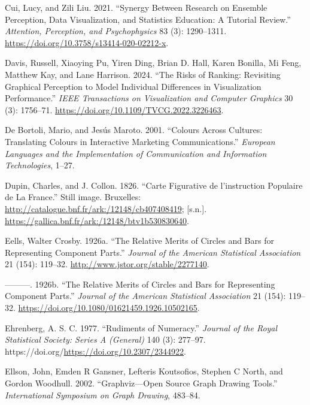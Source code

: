 \documentclass[
  letterpaper,
  DIV=11,
  numbers=noendperiod]{scrreprt}
\newlength{\cslhangindent}
\newenvironment{CSLReferences}[2] %
 {\begin{list}{}{%
  \setlength{\itemindent}{0pt}
  \setlength{\leftmargin}{0pt}
  \setlength{\parsep}{0pt}
  \ifodd #1
   \setlength{\leftmargin}{\cslhangindent}
   \setlength{\itemindent}{-1\cslhangindent}
  \fi
  \setlength{\itemsep}{#2\baselineskip}}}
 {\end{list}}
\begin{document}
\begin{CSLReferences}{1}{0}
Cui, Lucy, and Zili Liu. 2021. {``Synergy Between Research on Ensemble
Perception, Data Visualization, and Statistics Education: A Tutorial
Review.''} \emph{Attention, Perception, and Psychophysics} 83 (3):
1290--1311. \url{https://doi.org/10.3758/s13414-020-02212-x}.

Davis, Russell, Xiaoying Pu, Yiren Ding, Brian D. Hall, Karen Bonilla,
Mi Feng, Matthew Kay, and Lane Harrison. 2024. {``The Risks of Ranking:
Revisiting Graphical Perception to Model Individual Differences in
Visualization Performance.''} \emph{IEEE Transactions on Visualization
and Computer Graphics} 30 (3): 1756--71.
\url{https://doi.org/10.1109/TVCG.2022.3226463}.

De Bortoli, Mario, and Jesús Maroto. 2001. {``Colours Across Cultures:
Translating Colours in Interactive Marketing Communications.''}
\emph{European Languages and the Implementation of Communication and
Information Technologies}, 1--27.

Dupin, Charles, and J. Collon. 1826. {``Carte Figurative de
l'instruction Populaire de La France.''} Still image. Bruxelles:
\url{http://catalogue.bnf.fr/ark:/12148/cb407408419}; {[}s.n.{]}.
\url{https://gallica.bnf.fr/ark:/12148/btv1b530830640}.

Eells, Walter Crosby. 1926a. {``The Relative Merits of Circles and Bars
for Representing Component Parts.''} \emph{Journal of the American
Statistical Association} 21 (154): 119--32.
\url{http://www.jstor.org/stable/2277140}.

---------. 1926b. {``The Relative Merits of Circles and Bars for
Representing Component Parts.''} \emph{Journal of the American
Statistical Association} 21 (154): 119--32.
\url{https://doi.org/10.1080/01621459.1926.10502165}.

Ehrenberg, A. S. C. 1977. {``Rudiments of Numeracy.''} \emph{Journal of
the Royal Statistical Society: Series A (General)} 140 (3): 277--97.
https://doi.org/\url{https://doi.org/10.2307/2344922}.

Ellson, John, Emden R Gansner, Lefteris Koutsofios, Stephen C North, and
Gordon Woodhull. 2002. {``Graphviz---Open Source Graph Drawing Tools.''}
\emph{International Symposium on Graph Drawing}, 483--84.


\end{CSLReferences}
\end{document}
